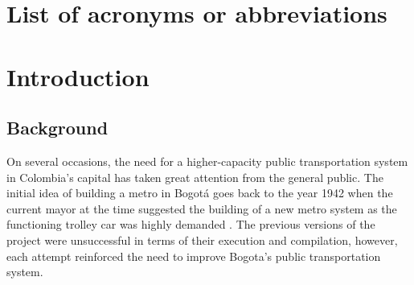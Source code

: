 \documentclass[12pt, a4paper]{report}
\begin{document}
\chapter*{List of acronyms or abbreviations}
\begin{sortedlist} %
  \end{sortedlist}
%
%
%
%
%
%
%

\chapter{Introduction} \label{Chap1}

\section{Background}


On several occasions, the need for a higher-capacity public transportation system in Colombia's capital has taken great attention from the general public. The initial idea of building a metro in Bogot\'{a} goes back to the year 1942 when the current mayor at the time suggested the building of a new metro system as the functioning trolley car was highly demanded \citep{metrodebogotaHistoriaMetroBogota2011}. The previous versions of the project were unsuccessful in terms of their execution and compilation, however, each attempt reinforced the need to improve Bogota's public transportation system.
\end{document}
